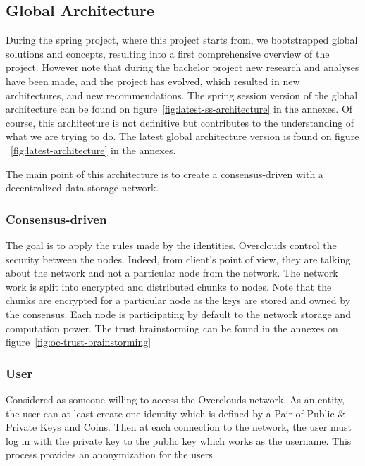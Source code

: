 
\subsection{Global Architecture}
During the spring project, where this project starts from, we bootstrapped global solutions and concepts, resulting into a first comprehensive overview of the project. However note that during the bachelor project new research and analyses have been made, and the project has evolved, which resulted in new architectures, and new recommendations. The spring session version of the global architecture can be found on figure~\ref{fig:latest-ss-architecture} in the annexes. Of course, this architecture is not definitive but contributes to the understanding of what we are trying to do. The latest global architecture version is found on figure ~\ref{fig:latest-architecture} in the annexes.

The main point of this architecture is to create a consensus-driven with a decentralized data storage network.

\subsubsection{Consensus-driven} The goal is to apply the rules made by the identities. Overclouds control the security between the nodes. Indeed, from client's point of view, they are talking about the network and not a particular node from the network. The network work is split into encrypted and distributed chunks to nodes. Note that the chunks are encrypted for a particular node as the keys are stored and owned by the consensus. Each node is participating by default to the network storage and computation power. The trust brainstorming can be found in the annexes on figure~\ref{fig:oc-trust-brainstorming}

\subsubsection{User} Considered as someone willing to access the Overclouds network. As an entity, the user can at least create one identity which is defined by a Pair of Public \& Private Keys and Coins. Then at each connection to the network, the user must log in with the private key to the public key which works as the username. This process provides an anonymization for the users.

